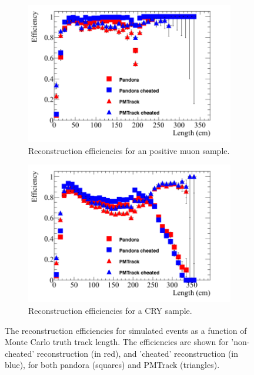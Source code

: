 \begin{figure}[h!]
  \centering
  \begin{subfigure}{0.48\textwidth}
    \centering
    \includegraphics[width=\textwidth]{Effic_AntiMuon_500V_All_Length}
    \caption{Reconstruction efficiencies for an positive muon sample.}
    \label{fig:SimEffic_Length_AMu}
  \end{subfigure}%
  \hspace{0.03\textwidth}%
  \begin{subfigure}{0.48\textwidth}
    \centering
    \includegraphics[width=\textwidth]{Effic_Cosmics_500V_All_Length}
    \caption{Reconstruction efficiencies for a CRY sample.}
    \label{fig:SimEffic_Length_CRY}
  \end{subfigure}
  \caption[The reconstruction efficiencies for simulated events as a function of Monte Carlo truth track length.]
          {The reconstruction efficiencies for simulated events as a function of Monte Carlo truth track length. The efficiencies are shown for 'non-cheated' reconstruction (in red), and 'cheated' reconstruction (in blue), for both pandora (squares) and PMTrack (triangles).}
          \label{fig:SimEffic_Length}
\end{figure}

